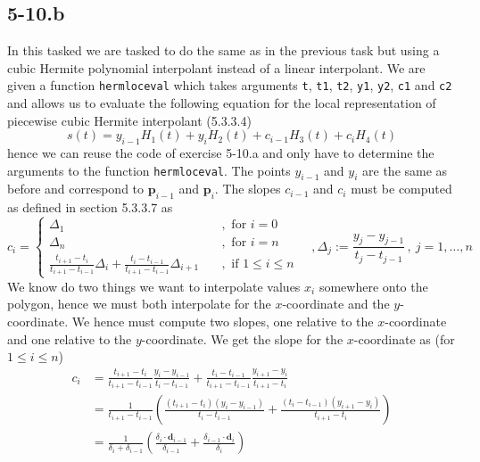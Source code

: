 \documentclass{article}
\begin{document}
\subsection*{5-10.b}
In this tasked we are tasked to do the same as in the previous task but using a cubic Hermite polynomial interpolant instead of a linear interpolant. We are given a function \verb|hermloceval| which takes arguments \verb|t|, \verb|t1|, \verb|t2|, \verb|y1|, \verb|y2|, \verb|c1| and \verb|c2| and allows us to evaluate the following equation for the local representation of piecewise cubic Hermite interpolant (5.3.3.4)
\begin{equation*}
    s\left(t\right) = y_{i-1}H_{1}\left(t\right) + y_{i}H_{2}\left(t\right) + c_{i-1}H_{3}\left(t\right) + c_{i}H_{4}\left(t\right)
\end{equation*}
hence we can reuse the code of exercise 5-10.a and only have to determine the arguments to the function \verb|hermloceval|. The points $y_{i-1}$ and $y_{i}$ are the same as before and correspond to $\mathbf{p}_{i-1}$ and $\mathbf{p}_{i}$. The slopes $c_{i-1}$ and $c_{i}$ must be computed as defined in section 5.3.3.7 as
\begin{equation*}
    c_{i} = 
    \begin{cases}
    \Delta_{1} &,\text{ for } i = 0 \\
    \Delta_{n} &,\text{ for } i = n \\
    \frac{t_{i+1} - t_{i}}{t_{i+1}-t_{i-1}}\Delta_{i} + \frac{t_{i} - t_{i-1}}{t_{i+1}-t_{i-1}}\Delta_{i+1} \quad &,\text{ if } 1 \leq i \leq n
    \end{cases} \quad , \Delta_{j} := \frac{y_{j} - y_{j - 1}}{t_{j} - t_{j-1}}\,,\: j = 1, \dots, n
\end{equation*}
We know do two things we want to interpolate values $x_{i}$ somewhere onto the polygon, hence we must both interpolate for the $x$-coordinate and the $y$-coordinate. We hence must compute two slopes, one relative to the $x$-coordinate and one relative to the $y$-coordinate. We get the slope for the $x$-coordinate as (for $1 \leq i \leq n$)
\begin{align*}
c_{i} &=
   \frac{t_{i+1} - t_{i}}{t_{i+1}-t_{i-1}}\frac{y_{i} - y_{i - 1}}{t_{i} - t_{i-1}} + \frac{t_{i} - t_{i-1}}{t_{i+1}-t_{i-1}}\frac{y_{i+1} - y_{i}}{t_{i+1} - t_{i}} \\
   &= \frac{1}{t_{i+1} - t_{i - 1}}\left(\frac{\left(t_{i+1} - t_{i}\right) \left(y_{i}-y_{i-1}\right)}{t_{i}-t_{i-1}} + \frac{\left(t_{i}-t_{i-1}\right)\left(y_{i+1} - y_{i}\right)}{t_{i+1} - t_{i}}\right)  \\
   &=  \frac{1}{\delta_{i} + \delta_{i-1}}\left(\frac{\delta_{i} \cdot \mathbf{d}_{i-1} }{\delta_{i-1}} + \frac{\delta_{i-1}\cdot\mathbf{d}_{i}}{\delta_{i}}\right)
\end{align*}
\end{document}
